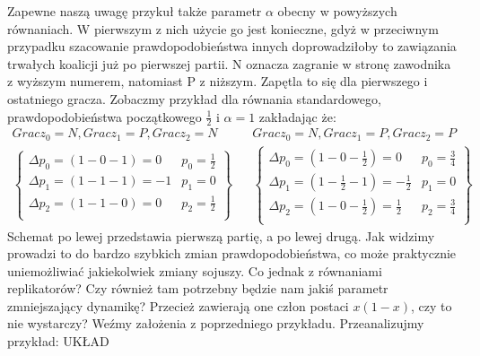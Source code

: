 Zapewne naszą uwagę przykuł także parametr $\alpha$ obecny w powyższych równaniach. W pierwszym z nich użycie go jest konieczne, gdyż w przeciwnym przypadku szacowanie prawdopodobieństwa innych doprowadziłoby to zawiązania trwałych koalicji już po pierwszej partii. N oznacza zagranie w stronę zawodnika z wyższym numerem, natomiast P z niższym. Zapętla to się dla pierwszego i ostatniego gracza. Zobaczmy przykład dla równania standardowego, prawdopodobieństwa początkowego $\frac{1}{2}$ i $\alpha = 1$ zakładając że:
\begin{align*}
Gracz_0 = N, Gracz_1 = P, Gracz_2 = N && Gracz_0 = N, Gracz_1 = P, Gracz_2 = P\\
\left\{
\begin{array}{ll}
\Delta p_0 = (1 - 0 - 1) =  0 & p_0=\frac{1}{2}\\
\Delta p_1 = (1 - 1 - 1) =  -1 & p_1= 0\\
\Delta p_2 = (1 - 1 - 0) =  0 & p_2=\frac{1}{2}\\
\end{array} 
\right\} &&
\left\{
\begin{array}{ll}
\Delta p_0 = (1 - 0 - \frac{1}{2}) =  0 & p_0=\frac{3}{4}\\
\Delta p_1 = (1 - \frac{1}{2} - 1) =  -\frac{1}{2} & p_1= 0\\
\Delta p_2 = (1 - 0 - \frac{1}{2}) =  \frac{1}{2} & p_2=\frac{3}{4}\\
\end{array}
\right\}
\end{align*}
Schemat po lewej przedstawia pierwszą partię, a po lewej drugą. Jak widzimy prowadzi to do bardzo szybkich zmian prawdopodobieństwa, co może praktycznie uniemożliwiać jakiekolwiek zmiany sojuszy. Co jednak z równaniami replikatorów? Czy również tam potrzebny będzie nam jakiś parametr zmniejszający dynamikę? Przecież zawierają one człon postaci $x(1-x)$, czy to nie wystarczy? Weźmy założenia z poprzedniego przykładu. Przeanalizujmy przykład: {\color{red} UKŁAD}
